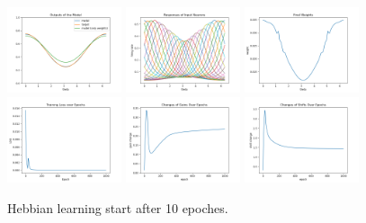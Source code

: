 \documentclass[12pt, a4paper]{article}
\begin{document}
\begin{figure}[H]
    \centering
    \includegraphics[width=0.3\textwidth]{baseline_abb05/fig/0122_abb05_bphebb_onlyweights.png}
    \includegraphics[width=0.3\textwidth]{baseline_abb05/fig/0122_abb05_bphebb_rf.png}
    \includegraphics[width=0.3\textwidth]{baseline_abb05/fig/0122_abb05_bphebb_weights.png}
    \\
    \includegraphics[width=0.3\textwidth]{baseline_abb05/fig/0122_abb05_bphebb_loss.png}
    \includegraphics[width=0.3\textwidth]{baseline_abb05/fig/0122_abb05_bphebb_gc.png}
    \includegraphics[width=0.3\textwidth]{baseline_abb05/fig/0122_abb05_bphebb_sc.png}\\
    \caption{Hebbian learning start after 10 epoches.}
    \label{fig:1}
\end{figure}
\end{document}
